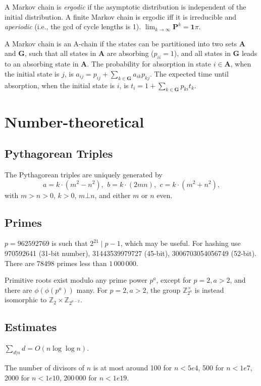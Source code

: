 {%
A Markov chain is \emph{ergodic} if the asymptotic distribution is independent of the initial distribution.
A finite Markov chain is ergodic iff it is irreducible and \emph{aperiodic} (i.e., the gcd of cycle lengths is 1).
$\lim_{k\rightarrow\infty}\mathbf{P}^k = \mathbf{1}\pi$.

A Markov chain is an A-chain if the states can be partitioned into two sets $\mathbf{A}$ and $\mathbf{G}$, such that all states in $\mathbf{A}$ are absorbing ($p_{ii}=1$), and all states in $\mathbf{G}$ leads to an absorbing state in $\mathbf{A}$.
The probability for absorption in state $i\in\mathbf{A}$, when the initial state is $j$, is $a_{ij} = p_{ij}+\sum_{k\in\mathbf{G}} a_{ik}p_{kj}$.
The expected time until absorption, when the initial state is $i$, is $t_i = 1+\sum_{k\in\mathbf{G}}p_{ki}t_k$.
}

\section{Number-theoretical}

\subsection{Pythagorean Triples}
 The Pythagorean triples are uniquely generated by
 $$a=k\cdot (m^{2}-n^{2}),\ \,b=k\cdot (2mn),\ \,c=k\cdot (m^{2}+n^{2}),$$
 with $m > n > 0$, $k > 0$, $m \bot n$, and either $m$ or $n$ even.

\subsection{Primes}
	$p=962592769$ is such that $2^{21} \mid p-1$, which may be useful. For hashing
	use 970592641 (31-bit number), 31443539979727 (45-bit), 3006703054056749
	(52-bit). There are 78498 primes less than $1\,000\,000$.

	Primitive roots exist modulo any prime power $p^a$, except for $p = 2, a > 2$, and there are $\phi(\phi(p^a))$ many.
	For $p = 2, a > 2$, the group ${\mathbb Z}_{2^a}^\times$ is instead isomorphic to ${\mathbb Z}_2 \times {\mathbb Z}_{2^{a-2}}$.

\subsection{Estimates}
	$\sum_{d|n} d = O(n \log \log n)$.

	The number of divisors of $n$ is at most around 100 for $n < 5e4$, 500 for $n < 1e7$, 2000 for $n < 1e10$, $200\,000$ for $n < 1e19$.
